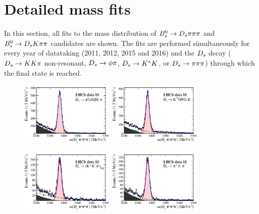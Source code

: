 \section{Detailed mass fits}
\label{sec:DetailedMassfits}

In this section, all fits to the mass distribution of ${{B}^0_{s}}\rightarrow{\ensuremath{{D}_{s}}}{\ensuremath{\pi}}{\ensuremath{\pi}}{\ensuremath{\pi}}$ and ${{B}^0_{s}}\rightarrow{\ensuremath{{D}_{s}}}{\ensuremath{K}}{\ensuremath{\pi}}{\ensuremath{\pi}}$ candidates are shown. 
The fits are performed simultaneously for every year of datataking (2011, 2012, 2015 and 2016) 
and the ${{D}_{s}}$ decay (${{D}_{s}}\rightarrow{\ensuremath{K}}{\ensuremath{K}}{\ensuremath{\pi}}$ non-resonant, ${{D}_{s}}\rightarrow\phi\pi$, ${{D}_{s}}\rightarrow{\ensuremath{{K}^*}}{\ensuremath{K}}$, or ${{D}_{s}}\rightarrow{\ensuremath{\pi}}{\ensuremath{\pi}}{\ensuremath{\pi}}$) through which the final state is reached.    


\begin{figure}[h]
\centering
\includegraphics[height=!,width=0.4\textwidth]{figs/MassFit/norm_y11_phipi.pdf}
\includegraphics[height=!,width=0.4\textwidth]{figs/MassFit/norm_y11_KsK.pdf}

\includegraphics[height=!,width=0.4\textwidth]{figs/MassFit/norm_y11_KKpi_NR.pdf}
\includegraphics[height=!,width=0.4\textwidth]{figs/MassFit/norm_y11_pipipi.pdf}


\end{figure}

